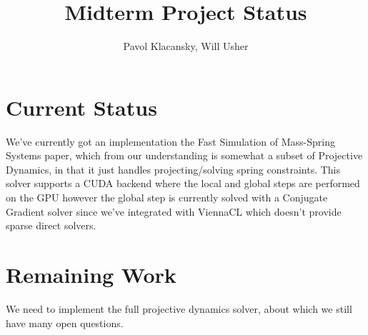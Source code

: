 \documentclass[11pt]{article}
\begin{document}
\title{Midterm Project Status}
\author{Pavol Klacansky, Will Usher}
\maketitle

\section{Current Status}

We've currently got an implementation the Fast Simulation of Mass-Spring Systems paper, which
from our understanding is somewhat a subset of Projective Dynamics, in that it just handles
projecting/solving spring constraints. This solver supports a CUDA backend where the local
and global steps are performed on the GPU however the global step is currently solved with
a Conjugate Gradient solver since we've integrated with ViennaCL which doesn't provide
sparse direct solvers.

\section{Remaining Work}

We need to implement the full projective dynamics solver, about which we still have many open
questions.
\end{document}
